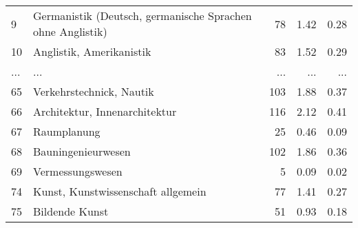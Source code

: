 \begin{longtable}{lXrrr}
        9 & \multicolumn{1}{X}{Germanistik (Deutsch, germanische Sprachen ohne Anglistik)} & %
          \num{78} &
          \num[round-mode=places,round-precision=2]{1.42} &
          \num[round-mode=places,round-precision=2]{0.28} \\
        10 & \multicolumn{1}{X}{Anglistik, Amerikanistik} & %
          \num{83} &
          \num[round-mode=places,round-precision=2]{1.52} &
          \num[round-mode=places,round-precision=2]{0.29} \\
       ... & ... & ... & ... & ... \\
        65 & \multicolumn{1}{X}{Verkehrstechnick, Nautik} & %
          \num{103} &
          \num[round-mode=places,round-precision=2]{1.88} &
          \num[round-mode=places,round-precision=2]{0.37} \\

        66 & \multicolumn{1}{X}{Architektur, Innenarchitektur} & %
          \num{116} &
          \num[round-mode=places,round-precision=2]{2.12} &
          \num[round-mode=places,round-precision=2]{0.41} \\

        67 & \multicolumn{1}{X}{Raumplanung} & %
          \num{25} &
          \num[round-mode=places,round-precision=2]{0.46} &
          \num[round-mode=places,round-precision=2]{0.09} \\

        68 & \multicolumn{1}{X}{Bauningenieurwesen} & %
          \num{102} &
          \num[round-mode=places,round-precision=2]{1.86} &
          \num[round-mode=places,round-precision=2]{0.36} \\

        69 & \multicolumn{1}{X}{Vermessungswesen} & %
          \num{5} &
          \num[round-mode=places,round-precision=2]{0.09} &
          \num[round-mode=places,round-precision=2]{0.02} \\

        74 & \multicolumn{1}{X}{Kunst, Kunstwissenschaft allgemein} & %
          \num{77} &
          \num[round-mode=places,round-precision=2]{1.41} &
          \num[round-mode=places,round-precision=2]{0.27} \\

        75 & \multicolumn{1}{X}{Bildende Kunst} & %
          \num{51} &
          \num[round-mode=places,round-precision=2]{0.93} &
          \num[round-mode=places,round-precision=2]{0.18} \\


\end{longtable}
